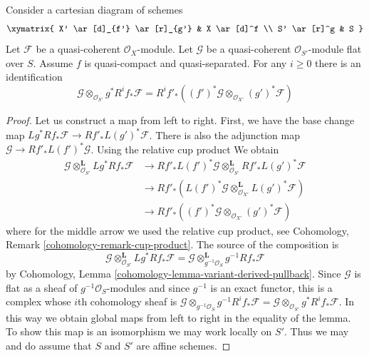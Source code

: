 \begin{lemma}
\label{lemma-base-change-tensor-with-flat}
Consider a cartesian diagram of schemes
$$
\xymatrix{
X' \ar[d]_{f'} \ar[r]_{g'} & X \ar[d]^f \\
S' \ar[r]^g & S
}
$$
Let $\mathcal{F}$ be a quasi-coherent $\mathcal{O}_X$-module.
Let $\mathcal{G}$ be a quasi-coherent $\mathcal{O}_{S'}$-module
flat over $S$. Assume $f$ is quasi-compact and quasi-separated.
For any $i \geq 0$ there is an identification
$$
\mathcal{G} \otimes_{\mathcal{O}_{S'}} g^*R^if_*\mathcal{F} =
R^if'_*\left((f')^*\mathcal{G}
\otimes_{\mathcal{O}_{X'}} (g')^*\mathcal{F}\right)
$$
\end{lemma}

\begin{proof}
Let us construct a map from left to right. First, we have the base change map
$Lg^*Rf_*\mathcal{F} \to Rf'_*L(g')^*\mathcal{F}$. There is also the adjunction
map $\mathcal{G} \to Rf'_*L(f')^*\mathcal{G}$. Using the relative cup product
We obtain
\begin{align*}
\mathcal{G}
\otimes_{\mathcal{O}_{S'}}^\mathbf{L}
Lg^*Rf_*\mathcal{F}
& \to
Rf'_*L(f')^*\mathcal{G}
\otimes_{\mathcal{O}_{S'}}^\mathbf{L}
Rf'_*L(g')^*\mathcal{F} \\
& \to
Rf'_*\left(L(f')^*\mathcal{G}
\otimes_{\mathcal{O}_{X'}}^\mathbf{L}
L(g')^*\mathcal{F}\right) \\
& \to
Rf'_*\left((f')^*\mathcal{G}
\otimes_{\mathcal{O}_{X'}} (g')^*\mathcal{F}\right)
\end{align*}
where for the middle arrow we used the relative cup product, see
Cohomology, Remark \ref{cohomology-remark-cup-product}.
The source of the composition is
$$
\mathcal{G} \otimes_{\mathcal{O}_{S'}}^\mathbf{L} Lg^*Rf_*\mathcal{F} =
\mathcal{G} \otimes_{g^{-1}\mathcal{O}_S}^\mathbf{L} g^{-1}Rf_*\mathcal{F}
$$
by Cohomology, Lemma \ref{cohomology-lemma-variant-derived-pullback}.
Since $\mathcal{G}$ is flat as a sheaf of $g^{-1}\mathcal{O}_S$-modules
and since $g^{-1}$ is an exact functor, this is a complex whose
$i$th cohomology sheaf is
$\mathcal{G} \otimes_{g^{-1}\mathcal{O}_S} g^{-1}R^if_*\mathcal{F} =
\mathcal{G} \otimes_{\mathcal{O}_{S'}} g^*R^if_*\mathcal{F}$.
In this way we obtain global maps from left to right in the
equality of the lemma. To show this map is an isomorphism we may
work locally on $S'$. Thus we may and do assume that $S$ and $S'$
are affine schemes.


\end{proof}

